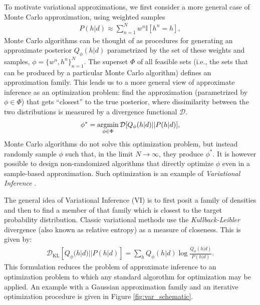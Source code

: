 To motivate variational approximations, we first consider a more general case of Monte Carlo approximation, using weighted samples
\begin{align}
    P(h|d) \approx \sum_{n=1}^N w^n \mathbb{I}[h^n = h],
    \label{eq:montecarlo}
\end{align}
Monte Carlo algorithms can be thought of as procedures for generating an approximate posterior $Q_\phi(h|d)$ parametrized by the set of these weights and samples, $\phi = \{ w^n, h^n \}_{n=1}^N$. The superset $\Phi$ of all feasible sets (i.e., the sets that can be produced by a particular Monte Carlo algorithm) defines an approximation family. This leads us to a more general view of approximate inference as an optimization problem: find the approximation (parametrized by $\phi \in \Phi$) that gets ``closest'' to the true posterior, where dissimilarity between the two distributions is measured by a divergence functional $\mathcal{D}$. 
\begin{align}
\phi^\ast = \operatorname*{argmin}_{\phi \in \Phi} \mathcal{D}[Q_\phi(h|d)||P(h|d)],
\end{align}
Monte Carlo algorithms do not solve this optimization problem, but instead randomly sample $\phi$ such that, in the limit $N \rightarrow \infty$, they produce $\phi^\ast$. It is however possible to design non-randomized algorithms that directly optimize $\phi$ even in a sample-based approximation\citep{saeedi2017variational}. Such optimization is an example of \emph{Variational Inference} \citep{jordan1999introduction}.

The general idea of Variational Inference (VI) is to first posit a family of densities and then to find a member of that family which is closest to the target probability distribution. Classic variational methods use the \textit{Kullback-Leibler} divergence (also known as relative entropy) as a measure of closeness. This is given by:
\begin{align}
\mathcal{D}_{\text{KL}}[Q_\phi(h|d)||P(h|d)] = \sum_h Q_\phi(h|d) \log \frac{Q_\phi(h|d)}{P(h|d)}.
\end{align}
This formulation reduces the problem of approximate inference to an optimization problem to which any standard algorothm for optimization may be applied. An example with a Gaussian approximation family and an iterative optimization procedure is given in Figure \ref{fig:var_schematic}.


